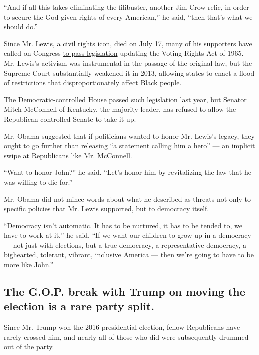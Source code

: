 ``And if all this takes eliminating the filibuster, another Jim Crow
relic, in order to secure the God-given rights of every American,'' he
said, ``then that's what we should do.''

Since Mr. Lewis, a civil rights icon,
\href{https://www.nytimes3xbfgragh.onion/2020/07/17/us/john-lewis-dead.html}{died
on July 17}, many of his supporters have called on Congress
\href{https://www.nytimes3xbfgragh.onion/2020/07/21/us/john-lewis-voting-rights-act.html}{to
pass legislation} updating the Voting Rights Act of 1965. Mr. Lewis's
activism was instrumental in the passage of the original law, but the
Supreme Court substantially weakened it in 2013, allowing states to
enact a flood of restrictions that disproportionately affect Black
people.

The Democratic-controlled House passed such legislation last year, but
Senator Mitch McConnell of Kentucky, the majority leader, has refused to
allow the Republican-controlled Senate to take it up.

Mr. Obama suggested that if politicians wanted to honor Mr. Lewis's
legacy, they ought to go further than releasing ``a statement calling
him a hero'' --- an implicit swipe at Republicans like Mr. McConnell.

``Want to honor John?'' he said. ``Let's honor him by revitalizing the
law that he was willing to die for.''

Mr. Obama did not mince words about what he described as threats not
only to specific policies that Mr. Lewis supported, but to democracy
itself.

``Democracy isn't automatic. It has to be nurtured, it has to be tended
to, we have to work at it,'' he said. ``If we want our children to grow
up in a democracy --- not just with elections, but a true democracy, a
representative democracy, a bighearted, tolerant, vibrant, inclusive
America --- then we're going to have to be more like John.''

\hypertarget{the-gop-break-with-trump-on-moving-the-election-is-a-rare-party-split}{%
\subsection{The G.O.P. break with Trump on moving the election is a rare
party
split.}\label{the-gop-break-with-trump-on-moving-the-election-is-a-rare-party-split}}

Since Mr. Trump won the 2016 presidential election, fellow Republicans
have rarely crossed him, and nearly all of those who did were
subsequently drummed out of the party.

